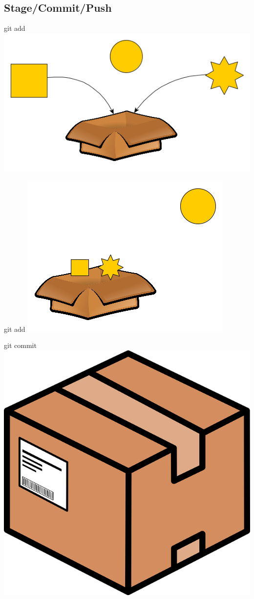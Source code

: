 \documentclass{beamer}
\begin{document}
\subsection{Stage/Commit/Push}

\begin{frame}{git add}
    \centering
    \includegraphics[width=0.7\linewidth]{img/git_add_1.png}
\end{frame}
\begin{frame}{git add}
    \centering
    \includegraphics[width=0.7\linewidth]{img/git_add_2.png}
\end{frame}

\begin{frame}{git commit}
    \centering
    \includegraphics[width=0.4\linewidth]{img/commit.png}
\end{frame}
\end{document}
